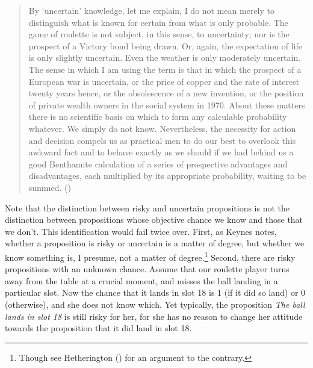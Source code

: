 \documentclass[
  10pt,
  letterpaper,
  DIV=11,
  numbers=noendperiod,
  twoside]{scrartcl}
\begin{document}
\begin{quote}
By `uncertain' knowledge, let me explain, I do not mean merely to
distinguish what is known for certain from what is only probable. The
game of roulette is not subject, in this sense, to uncertainty; nor is
the prospect of a Victory bond being drawn. Or, again, the expectation
of life is only slightly uncertain. Even the weather is only moderately
uncertain. The sense in which I am using the term is that in which the
prospect of a European war is uncertain, or the price of copper and the
rate of interest twenty years hence, or the obsolescence of a new
invention, or the position of private wealth owners in the social system
in 1970. About these matters there is no scientific basis on which to
form any calculable probability whatever. We simply do not know.
Nevertheless, the necessity for action and decision compels us as
practical men to do our best to overlook this awkward fact and to behave
exactly as we should if we had behind us a good Benthamite calculation
of a series of prospective advantages and disadvantages, each multiplied
by its appropriate probability, waiting to be summed.
()
\end{quote}

Note that the distinction between risky and uncertain propositions is
not the distinction between propositions whose objective chance we know
and those that we don't. This identification would fail twice over.
First, as Keynes notes, whether a proposition is risky or uncertain is a
matter of degree, but whether we know something is, I presume, not a
matter of degree.\footnote{Though see Hetherington
  () for an argument to the
  contrary.} Second, there are risky propositions with an unknown
chance. Assume that our roulette player turns away from the table at a
crucial moment, and misses the ball landing in a particular slot. Now
the chance that it lands in slot 18 is 1 (if it did so land) or 0
(otherwise), and she does not know which. Yet typically, the proposition
\emph{The ball lands in slot 18} is still risky for her, for she has no
reason to change her attitude towards the proposition that it did land
in slot 18.
\end{document}

